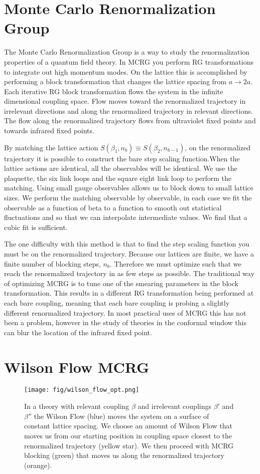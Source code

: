 \documentclass{PoS}
\begin{document}
\section{Monte Carlo Renormalization Group}
\label{sec:mcrg}
The Monte Carlo Renormalization Group is a way to study the renormalization properties of a quantum field theory.
In MCRG you perform RG transformations to integrate out high momentum modes.
On the lattice this is accomplished by performing a block transformation that changes the lattice spacing from $a \rightarrow 2a$.
Each iterative RG block transformation flows the system in the infinite dimensional coupling space.
Flow moves toward the renormalized trajectory in irrelevant directions and along the renormalized trajectory in relevant directions.
The flow along the renormalized trajectory flows from ultraviolet fixed points and towards infrared fixed points.

By matching the lattice action $S(\beta_1,n_b) \equiv S(\beta_2,n_{b-1})$, on the renormalized trajectory it is possible to construct the bare step scaling function.When the lattice actions are identical, all the observables will be identical.
We use the plaquette, the six link loops and the square eight link loop to perform the matching.
Using small gauge observables allows us to block down to small lattice sizes.
We perform the matching observable by observable, in each case we fit the observable as a function of beta to a function to smooth out statistical fluctuations and so that we can interpolate intermediate values.
We find that a cubic fit is sufficient.

The one difficulty with this method is that to find the step scaling function you must be on the renormalized trajectory.
Because our lattices are finite, we have a finite number of blocking steps, $n_b$.
Therefore we must optimize such that we reach the renormalized trajectory in as few steps as possible.
The traditional way of optimizing MCRG is to tune one of the smearing parameters in the block transformation.
This results in a different RG transformation being performed at each bare coupling, meaning that each bare coupling is probing a slightly different renormalized trajectory.
In most practical uses of MCRG this has not been a problem, however in the study of theories in the conformal window this can blur the location of the infrared fixed point.

\section{Wilson Flow MCRG}
\label{sec:wmcrg}
\begin{figure}[th]
  \centering
  \texttt{[image: fig/wilson\_flow\_opt.png]}
  \caption{In a theory with relevant coupling $\beta$ and irrelevant couplings $\beta'$ and $\beta''$ the Wilson Flow (blue) moves the system on a surface of constant lattice spacing.  We choose an amount of Wilson Flow that moves us from our starting position in coupling space closest to the renormalized trajectory (yellow star).  We then proceed with MCRG blocking (green) that moves us along the renormalized trajectory (orange).}
  \label{fig:wflow_opt}
\end{figure}
\end{document}
